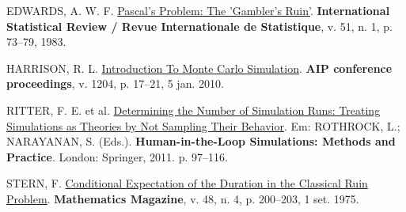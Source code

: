 \documentclass[
  brazilian,
  12pt,
]{article}
\newlength{\cslhangindent}
\newenvironment{CSLReferences}[2] %
 {\begin{list}{}{%
  \setlength{\itemindent}{0pt}
  \setlength{\leftmargin}{0pt}
  \setlength{\parsep}{0pt}
  \ifodd #1
   \setlength{\leftmargin}{\cslhangindent}
   \setlength{\itemindent}{-1\cslhangindent}
  \fi
  \setlength{\itemsep}{#2\baselineskip}}}
 {\end{list}}
\theoremstyle{definition}
\theoremstyle{definition}
\theoremstyle{remark}
\begin{document}
\protect{}\label{refs}
\begin{CSLReferences}{0}{1}
EDWARDS, A. W. F. \href{https://doi.org/10.2307/1402732}{Pascal's
Problem: The 'Gambler's Ruin'}. \textbf{International Statistical Review
/ Revue Internationale de Statistique}, v. 51, n. 1, p. 73--79, 1983.

HARRISON, R. L. \href{https://doi.org/10.1063/1.3295638}{Introduction To
Monte Carlo Simulation}. \textbf{{AIP} conference proceedings}, v. 1204,
p. 17--21, 5 jan. 2010.

RITTER, F. E. et al.
\href{https://doi.org/10.1007/978-0-85729-883-6_5}{Determining the
Number of Simulation Runs: Treating Simulations as Theories by Not
Sampling Their Behavior}. Em: ROTHROCK, L.; NARAYANAN, S. (Eds.).
\textbf{Human-in-the-Loop Simulations: Methods and Practice}. London:
Springer, 2011. p. 97--116.

STERN, F.
\href{https://doi.org/10.1080/0025570X.1975.11976486}{Conditional
Expectation of the Duration in the Classical Ruin Problem}.
\textbf{Mathematics Magazine}, v. 48, n. 4, p. 200--203, 1 set. 1975.

\end{CSLReferences}
\end{document}

